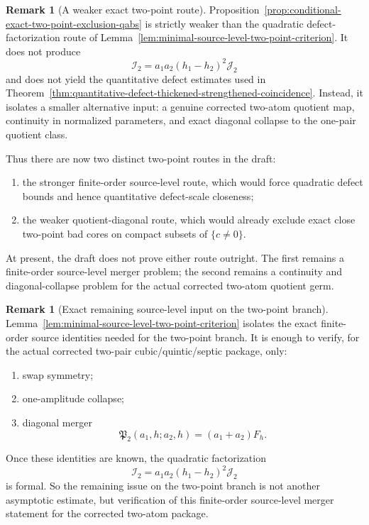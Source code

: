 \documentclass[11pt,a4paper]{amsart}
\theoremstyle{plain}
\theoremstyle{definition}
\newtheorem{remark}[theorem]{Remark}
\begin{document}
\begin{remark}[A weaker exact two-point route]
\label{rem:weaker-exact-two-point-route}
Proposition~\ref{prop:conditional-exact-two-point-exclusion-qabs} is strictly
weaker than the quadratic defect-factorization route of
Lemma~\ref{lem:minimal-source-level-two-point-criterion}. It does not produce
\[
\mathcal I_2=a_1a_2(h_1-h_2)^2\mathcal J_2
\]
and does not yield the quantitative defect estimates used in
Theorem~\ref{thm:quantitative-defect-thickened-strengthened-coincidence}.
Instead, it isolates a smaller alternative input: a genuine corrected two-atom
quotient map, continuity in normalized parameters, and exact diagonal collapse
to the one-pair quotient class.

Thus there are now two distinct two-point routes in the draft:

\begin{enumerate}
\item the stronger finite-order source-level route, which would force quadratic
defect bounds and hence quantitative defect-scale closeness;

\item the weaker quotient-diagonal route, which would already exclude exact
close two-point bad cores on compact subsets of $\{c\neq 0\}$.
\end{enumerate}

At present, the draft does not prove either route outright. The first remains a
finite-order source-level merger problem; the second remains a continuity and
diagonal-collapse problem for the actual corrected two-atom quotient germ.
\end{remark}

\begin{remark}[Exact remaining source-level input on the two-point branch]
\label{rem:wip-source-level-reduction-two-point-branch}
Lemma~\ref{lem:minimal-source-level-two-point-criterion} isolates the exact
finite-order source identities needed for the two-point branch. It is enough to
verify, for the actual corrected two-pair cubic/quintic/septic package, only:

\begin{enumerate}
\item swap symmetry;
\item one-amplitude collapse;
\item diagonal merger
\[
\mathfrak P_2(a_1,h;a_2,h)=(a_1+a_2)F_h.
\]
\end{enumerate}

Once these identities are known, the quadratic factorization
\[
\mathcal I_2=a_1a_2(h_1-h_2)^2\mathcal J_2
\]
is formal. So the remaining issue on the two-point branch is not another
asymptotic estimate, but verification of this finite-order source-level merger
statement for the corrected two-atom package.
\end{remark}
\end{document}
